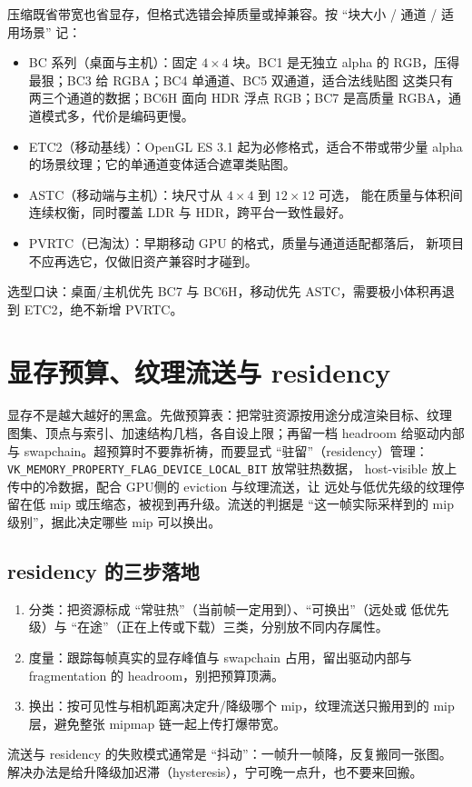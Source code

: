 \documentclass[12pt,a4paper,fontset=fandol]{ctexbook}
\newcommand{\Tp}[1]{\texttt{#1}}
\newcommand{\Bk}{\discretionary{}{}{}}
\newcommand{\Lang}[1]{\textsf{#1}}
\newcommand{\DomGPU}{\Lang{GPU}}
\begin{document}
压缩既省带宽也省显存，但格式选错会掉质量或掉兼容。按 ``块大小 / 通道 /
适用场景'' 记：
\begin{itemize}
  \item BC 系列（桌面与主机）：固定 $4\times4$ 块。BC1 是无独立 alpha 的
        RGB，压得最狠；BC3 给 RGBA；BC4 单通道、BC5 双通道，适合法线贴图
        这类只有两三个通道的数据；BC6H 面向 HDR 浮点 RGB；BC7 是高质量
        RGBA，通道模式多，代价是编码更慢。
  \item ETC2（移动基线）：OpenGL ES 3.1 起为必修格式，适合不带或带少量
        alpha 的场景纹理；它的单通道变体适合遮罩类贴图。
  \item ASTC（移动端与主机）：块尺寸从 $4\times4$ 到 $12\times12$ 可选，
        能在质量与体积间连续权衡，同时覆盖 LDR 与 HDR，跨平台一致性最好。
  \item PVRTC（已淘汰）：早期移动 GPU 的格式，质量与通道适配都落后，
        新项目不应再选它，仅做旧资产兼容时才碰到。
\end{itemize}
选型口诀：桌面/主机优先 BC7 与 BC6H，移动优先 ASTC，需要极小体积再退到
ETC2，绝不新增 PVRTC。

\section{显存预算、纹理流送与 residency}

显存不是越大越好的黑盒。先做预算表：把常驻资源按用途分成渲染目标、纹理
图集、顶点与索引、加速结构几档，各自设上限；再留一档 headroom 给驱动内部
与 swapchain。超预算时不要靠祈祷，而要显式 ``驻留''（residency）管理：
\Tp{VK\_{\Bk}MEMORY\_{\Bk}PROPERTY\_{\Bk}FLAG\_{\Bk}DEVICE\Bk\_{\Bk}LOCAL\_{\Bk}BIT} 放常驻热数据，
host-visible 放上传中的冷数据，配合 \DomGPU 侧的 eviction 与纹理流送，让
远处与低优先级的纹理停留在低 mip 或压缩态，被视到再升级。流送的判据是
``这一帧实际采样到的 mip 级别''，据此决定哪些 mip 可以换出。

\subsection{residency 的三步落地}

\begin{enumerate}
  \item 分类：把资源标成 ``常驻热''（当前帧一定用到）、``可换出''（远处或
        低优先级）与 ``在途''（正在上传或下载）三类，分别放不同内存属性。
  \item 度量：跟踪每帧真实的显存峰值与 swapchain 占用，留出驱动内部与
        fragmentation 的 headroom，别把预算顶满。
  \item 换出：按可见性与相机距离决定升/降级哪个 mip，纹理流送只搬用到的
        mip 层，避免整张 mipmap 链一起上传打爆带宽。
\end{enumerate}
流送与 residency 的失败模式通常是 ``抖动''：一帧升一帧降，反复搬同一张图。
解决办法是给升降级加迟滞（hysteresis），宁可晚一点升，也不要来回搬。
\end{document}
